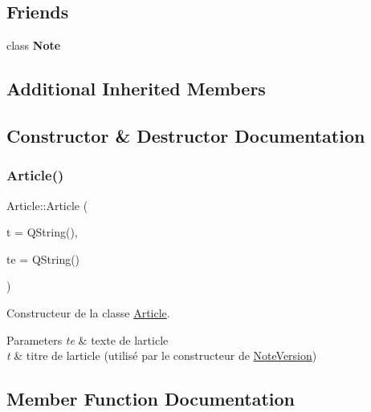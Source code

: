 \subsection*{Friends}
\begin{DoxyCompactItemize}
\item 
\mbox{\label{class_article_a93d7e72623acdfa5b079a11fbf2d9f9d}} 
class {\bfseries Note}
\end{DoxyCompactItemize}
\subsection*{Additional Inherited Members}


\subsection{Constructor \& Destructor Documentation}
\mbox{\label{class_article_a972ec00d52c495a57f8c657b96280327}} 
\subsubsection{\texorpdfstring{Article()}{Article()}}
{\footnotesize\ttfamily Article\+::\+Article (\begin{DoxyParamCaption}\item[{const Q\+String \&}]{t = {\ttfamily QString()},  }\item[{const Q\+String \&}]{te = {\ttfamily QString()} }\end{DoxyParamCaption})}



Constructeur de la classe \hyperlink{class_article}{Article}. 


\begin{DoxyParams}{Parameters}
{\em te} & texte de l\textquotesingle{}article \\
\hline
{\em t} & titre de l\textquotesingle{}article (utilisé par le constructeur de \hyperlink{class_note_version}{Note\+Version}) \\
\hline
\end{DoxyParams}


\subsection{Member Function Documentation}
\mbox{\label{class_article_a78188a4d3c5b071caf13db46ecdc32b9}} 
